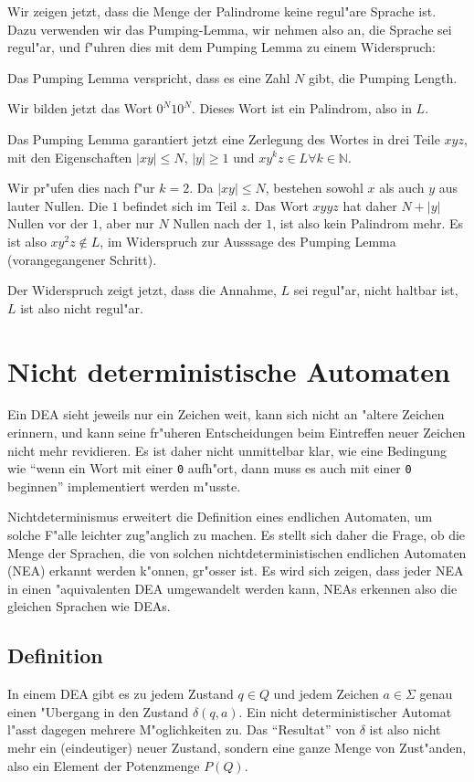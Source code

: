 Wir zeigen jetzt, dass die Menge der Palindrome keine regul"are Sprache ist.
Dazu verwenden wir das Pumping-Lemma, wir nehmen also an, die Sprache
sei regul"ar, und f"uhren dies mit dem Pumping Lemma zu einem
Widerspruch:
\begin{compactenum}
\item Das Pumping Lemma verspricht, dass es eine Zahl $N$ gibt, die
Pumping Length.
\item Wir bilden jetzt das Wort $0^N10^N$. Dieses Wort ist ein Palindrom,
also in $L$.
\item Das Pumping Lemma garantiert jetzt eine Zerlegung des Wortes
in drei Teile $xyz$, mit den Eigenschaften $|xy|\le N$, $|y|\ge 1$ und
$xy^kz\in L\forall k\in\mathbb N$.
\item Wir pr"ufen dies nach f"ur $k=2$. Da $|xy|\le N$, bestehen
sowohl $x$ als auch $y$ aus lauter Nullen. Die $1$ befindet sich im Teil $z$.
Das Wort $xyyz$ hat daher $N+|y|$ Nullen vor der $1$, aber nur $N$ Nullen
nach der $1$, ist also kein Palindrom mehr. Es ist also $xy^2z\not\in L$,
im Widerspruch zur Ausssage des Pumping Lemma (vorangegangener Schritt).
\end{compactenum}
Der Widerspruch zeigt jetzt, dass die Annahme, $L$ sei regul"ar, nicht
haltbar ist, $L$ ist also nicht regul"ar.

\section{Nicht deterministische Automaten\label{regulaer:nea}}
Ein DEA sieht jeweils nur ein Zeichen weit, kann sich nicht an "altere
Zeichen erinnern, und kann seine fr"uheren Entscheidungen beim Eintreffen
neuer Zeichen nicht mehr revidieren. Es ist daher nicht unmittelbar klar,
wie eine Bedingung wie ``wenn ein
Wort mit einer {\tt 0} aufh"ort, dann muss es auch mit einer {\tt 0}
beginnen'' implementiert werden m"usste.

Nichtdeterminismus erweitert 
die Definition eines endlichen Automaten, um solche F"alle leichter 
zug"anglich zu machen. Es stellt sich daher die Frage, ob die Menge 
der Sprachen, die von solchen nichtdeterministischen endlichen Automaten (NEA)
erkannt werden k"onnen,
gr"osser ist. Es wird sich zeigen, dass jeder NEA
in einen "aquivalenten DEA umgewandelt werden kann, NEAs erkennen also
die gleichen Sprachen wie DEAs.

\subsection{Definition\label{regulaer:definition-nea}}
In einem DEA gibt es zu jedem Zustand $q\in Q$
und jedem Zeichen $a\in\Sigma$ genau
einen "Ubergang in den Zustand $\delta(q,a)$.
Ein nicht deterministischer
Automat l"asst dagegen mehrere M"oglichkeiten zu. Das ``Resultat''
von $\delta$ ist also nicht mehr ein (eindeutiger) neuer Zustand, sondern
eine ganze Menge von Zust"anden, also ein Element der Potenzmenge $P(Q)$.

